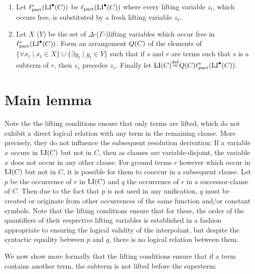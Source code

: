 \begin{defi}
\begin{enumerate}
		\item 
Let $\ell_\mathrm{part}^*(\operatorname{LI}^\bullet(C))$ be 
$\ell_\mathrm{part}(\operatorname{LI}^\bullet(C))$  where every lifting variable $z_t$, which occurs free, is substituted by a fresh lifting variable $z_{t'}$.
\label{lemma_part_renaming}

		\item Let $X$ ($Y$) be the set of $\Delta$-($\Gamma$-)lifting variables which occur free in  
			$\ell_\mathrm{part}^*(\operatorname{LI}^\bullet(C))$.
			Form an arrangement $Q(C)$ of the elements of $\{\forall x_t \mid x_t \in X\}\cup\allowbreak\{\exists y_t \mid y_t \in Y\}$ such that if $s$ and $r$ are terms such that $s$ is a subterm of $r$, then $z_s$ precedes $z_r$.
			Finally let $\LI(C) \defeq Q(C) \lifsym_\mathrm{part}^*(\LIpre(C))$.
			\qedhere
	\end{enumerate}
\end{defi}





\section{Main lemma}
Note the the lifting conditions ensure that only terms are lifted,
which do not exhibit a direct logical relation with any term in the remaining clause.
More precisely, they do not influence the subsequent resolution derivation: 
If a variable $x$ occurs in $\operatorname{LI}(C)$ but not in $C$, then as clauses are variable-disjoint, the variable $x$ does not occur in any other clause.
For ground terms $r$ however which occur in $\operatorname{LI}(C)$ but not in $C$,
it is possible for them to cooccur in a subsequent clause. Let $p$ be the occurrence of $r$ in $\operatorname{LI}(C)$ and $q$ the occurrence of $r$ in a successor-clause of $C$.
Then due to the fact that $p$ is not used in any unification, 
$q$ must be created or originate from other occurrences of the same function and/or constant symbols.
Note that the lifting conditions ensure that for these, the order of the quantifiers of their respective lifting variables is established in a fashion appropriate to ensuring the logical validity of the interpolant, but despite the syntactic equality between $p$ and $q$, there is no logical relation between them.

We now show more formally that the lifting conditions ensure that if a term contains another term, the subterm is not lifted before the superterm:

